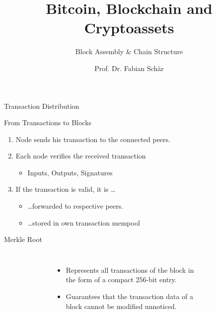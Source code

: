 \documentclass[]{beamer}
\title{Bitcoin, Blockchain and Cryptoassets}
\subtitle{Block Assembly \& Chain Structure}
\author{Prof. Dr. Fabian Schär}
\institute{University of Basel}
\begin{document}
\thispagestyle{empty}
\begin{frame}[noframenumbering]
	\titlepage
\end{frame}

\begin{frame}{Transaction Distribution}
\begin{figure}
	\centering
	\begin{tikzpicture}[scale=0.9, every node/.style={scale=0.9}]
		
	\end{tikzpicture}
\end{figure}
\end{frame}


\begin{frame}{From Transactions to Blocks}
	\begin{enumerate}
		\item<1-> Node sends his transaction to the connected peers.
		\item<1-> Each node verifies the received transaction
			\begin{itemize}
				\item<1-> Inputs, Outputs, Signatures
			\end{itemize}			 
		\item<1-> If the transaction is valid, it is \dots
			\begin{itemize}
				\item<1-> \dots forwarded to respective peers.
				\item<1-> \dots stored in own transaction mempool
			\end{itemize}
	\end{enumerate}	
	\vspace{1em}
\end{frame}

\begin{frame}{Merkle Root}
	\begin{columns}
		\begin{figure}
			
		\end{figure}
		\begin{itemize}
			\item Represents all transactions of the block in the form of a compact 256-bit entry.
			\item Guarantees that the transaction data of a block cannot be modified unnoticed.
		\end{itemize}
		\begin{figure}
			
		\end{figure}
	\end{columns}
\end{frame}
\end{document}

